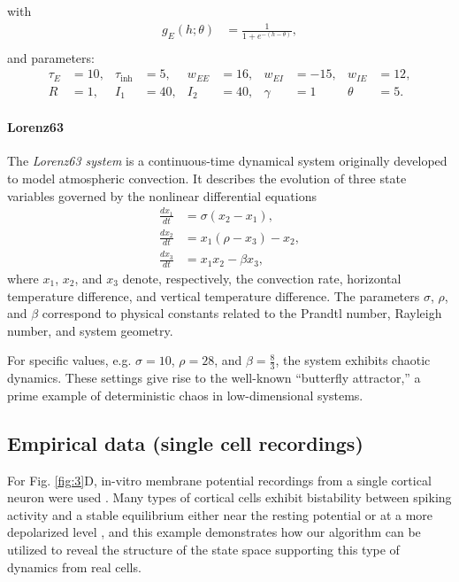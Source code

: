 \documentclass{article}
\theoremstyle{example}
\theoremstyle{plain}
\theoremstyle{definition}
\theoremstyle{remark}
\begin{document}
\noindent
with \begin{align}
    g_E(h;\theta) &= \frac{1}{1 + e^{-(h-\theta)}}, \\[4pt]
\end{align} 
and parameters:
\begin{align*}
    \tau_E &= 10, &
    \tau_{\text{inh}} &= 5, &
    w_{EE} &= 16, &
    w_{EI} &= -15, &
    w_{IE} &= 12, \\
    R &= 1, &
    I_1 &= 40, &
    I_2 &= 40, &
    \gamma &= 1 &
    \theta &=5.
\end{align*}

\color{black}

\paragraph{Lorenz63}
\label{sec:lorenz}
The \textit{Lorenz63 system} \citep{lorenz1963deterministic} is a continuous-time dynamical system originally developed to model atmospheric convection. It describes the evolution of three state variables governed by the nonlinear differential equations
\begin{align*}
    \frac{dx_1}{dt} &= \sigma (x_2 - x_1), \\
    \frac{dx_2}{dt} &= x_1 (\rho - x_3) - x_2, \\
    \frac{dx_3}{dt} &= x_1 x_2 - \beta x_3,
\end{align*}
where \(x_1\), \(x_2\), and \(x_3\) denote, respectively, the convection rate, horizontal temperature difference, and vertical temperature difference. The parameters \(\sigma\), \(\rho\), and \(\beta\) correspond to physical constants related to the Prandtl number, Rayleigh number, and system geometry.

For specific values, e.g. \(\sigma = 10\), \(\rho = 28\), and \(\beta = \frac{8}{3}\), the system exhibits chaotic dynamics. These settings give rise to the well-known “butterfly attractor,” a prime example of deterministic chaos in low-dimensional systems.


\subsection{Empirical data (single cell recordings)}
For Fig. \ref{fig:3}D, in-vitro membrane potential recordings from a single cortical neuron were used \citep{hertag2012approximation}. Many types of cortical cells exhibit bistability between spiking activity and a stable equilibrium either near the resting potential or at a more depolarized level \citep{izhikevich2007dynamical,durstewitz2007dynamical,Dovzhenok2012-ds}, and this example demonstrates how our algorithm can be utilized to reveal the structure of the state space supporting this type of dynamics from real cells.
\end{document}
